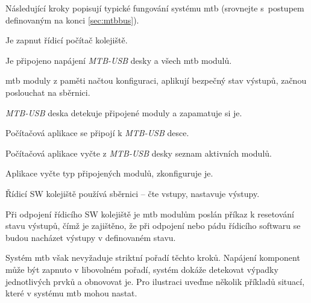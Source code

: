 Následující kroky popisují typické fungování systému \gls{mtb} (srovnejte
s~postupem definovaným na konci \ref{sec:mtbbus}).

\begin{compactenum}
\item Je zapnut řídicí počítač kolejiště.
\item Je připojeno napájení \textit{MTB-USB} desky a všech \gls{mtb} modulů.
\item \gls{mtb} moduly z paměti načtou konfiguraci, aplikují bezpečný stav
výstupů, začnou poslouchat na sběrnici.
\item \textit{MTB-USB} deska detekuje připojené moduly a zapamatuje si je.
\item Počítačová aplikace se připojí k \textit{MTB-USB} desce.
\item Počítačová aplikace vyčte z \textit{MTB-USB} desky seznam aktivních modulů.
\item Aplikace vyčte typ připojených modulů, zkonfiguruje je.
\item Řídicí SW kolejiště používá sběrnici – čte vstupy, nastavuje výstupy.
\item Při odpojení řídicího SW kolejiště je \gls{mtb} modulům poslán příkaz
	k resetování stavu výstupů, čímž je zajištěno, že při odpojení nebo pádu
	řídicího softwaru se budou nacházet výstupy v definovaném stavu.
\end{compactenum}

Systém \gls{mtb} však nevyžaduje striktní pořadí těchto kroků. Napájení
komponent může být zapnuto v libovolném pořadí, systém dokáže detekovat výpadky
jednotlivých prvků a obnovovat je. Pro ilustraci uveďme několik příkladů situací,
které v systému \gls{mtb} mohou nastat.

